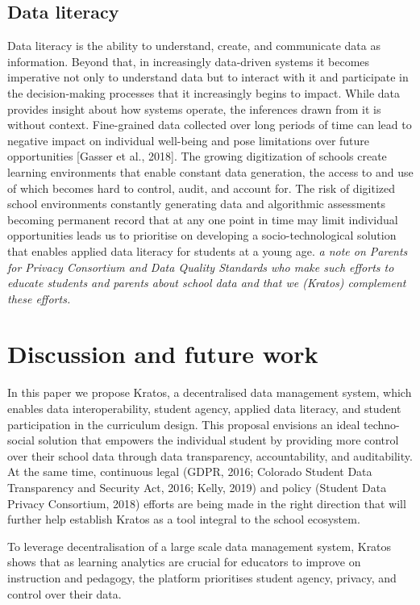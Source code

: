 \documentclass{article}
\begin{document}
\subsection{Data literacy}
Data literacy is the ability to understand, create, and communicate data as information. Beyond that, in increasingly data-driven systems it becomes imperative not only to understand data but to interact with it and participate in the decision-making processes that it increasingly begins to impact. While data provides insight about how systems operate, the inferences drawn from it is without context. Fine-grained data collected over long periods of time can lead to negative impact on individual well-being and pose limitations over future opportunities [Gasser et al., 2018]. The growing digitization of schools create learning environments that enable constant data generation, the access to and use of which becomes hard to control, audit, and account for. The risk of digitized school environments constantly generating data and algorithmic assessments becoming permanent record that at any one point in time may limit individual opportunities leads us to prioritise on developing a socio-technological solution that enables applied data literacy for students at a young age. \textit{a note on Parents for Privacy Consortium and Data Quality Standards who make such efforts to educate students and parents about school data and that we (Kratos) complement these efforts.}

\section{Discussion and future work}
In this paper we propose Kratos, a decentralised data management system, which enables data interoperability, student agency, applied data literacy, and student participation in the curriculum design. This proposal envisions an ideal techno-social solution that empowers the individual student by providing more control over their school data through data transparency, accountability, and auditability. At the same time, continuous legal (GDPR, 2016; Colorado Student Data Transparency and Security Act, 2016; Kelly, 2019) and policy (Student Data Privacy Consortium, 2018) efforts are being made in the right direction that will further help establish Kratos as a tool integral to the school ecosystem. 

To leverage decentralisation of a large scale data management system, Kratos shows that as learning analytics are crucial for educators to improve on instruction and pedagogy, the platform prioritises student agency, privacy, and control over their data.  
\end{document}
